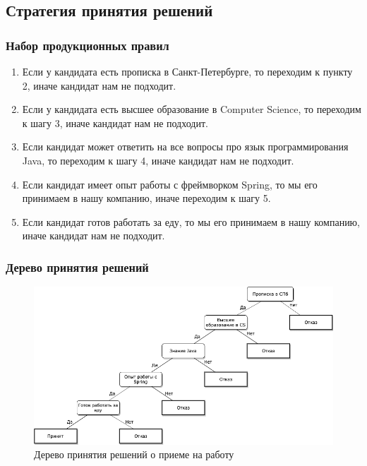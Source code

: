 \subsection{Стратегия принятия решений}

\subsubsection{Набор продукционных правил}

\begin{enumerate}
	\item Если у кандидата есть прописка в Санкт-Петербурге, то переходим к пункту 2, иначе кандидат нам не подходит.

	\item Если у кандидата есть высшее образование в Computer Science, то переходим к шагу 3, иначе кандидат нам не подходит.

	\item Если кандидат может ответить на все вопросы про язык программирования Java, то переходим к шагу 4, иначе кандидат нам не подходит.

	\item Если кандидат имеет опыт работы с фреймворком Spring, то мы его принимаем в нашу компанию, иначе переходим к шагу 5.

	\item Если кандидат готов работать за еду, то мы его принимаем в нашу компанию, иначе кандидат нам не подходит.
\end{enumerate}

\subsubsection{Дерево принятия решений}

\begin{figure}[H]
	\centering
	\includegraphics[width=\linewidth]{interview.png}
	\caption{Дерево принятия решений о приеме на работу}
	\label{fig:my_label}
\end{figure}

